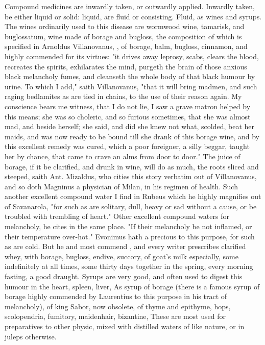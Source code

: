 {Compound medicines are inwardly taken, or outwardly applied. Inwardly taken, be either liquid or solid: liquid, are fluid or consisting. Fluid, as wines and syrups. The wines ordinarily used to this disease are wormwood wine, tamarisk, and buglossatum, wine made of borage and bugloss, the composition of which is specified in Arnoldus Villanovanus, , of borage, balm, bugloss, cinnamon, \etc{} and highly commended for its virtues: "it drives away leprosy, scabs, clears the blood, recreates the spirits, exhilarates the mind, purgeth the brain of those anxious black melancholy fumes, and cleanseth the whole body of that black humour by urine. To which I add," saith Villanovanus, "that it will bring madmen, and such raging bedlamites as are tied in chains, to the use of their reason again. My conscience bears me witness, that I do not lie, I saw a grave matron helped by this means; she was so choleric, and so furious sometimes, that she was almost mad, and beside herself; she said, and did she knew not what, scolded, beat her maids, and was now ready to be bound till she drank of this borage wine, and by this excellent remedy was cured, which a poor foreigner, a silly beggar, taught her by chance, that came to crave an alms from door to door." The juice of borage, if it be clarified, and drunk in wine, will do as much, the roots sliced and steeped, \etc{} saith Ant. Mizaldus,  who cities this story verbatim out of Villanovanus, and so doth Magninus a physician of Milan, in his regimen of health. Such another excellent compound water I find in Rubeus  which he highly magnifies out of Savanarola, "for such as are solitary, dull, heavy or sad without a cause, or be troubled with trembling of heart." Other excellent compound waters for melancholy, he cites in the same place. "If their melancholy be not inflamed, or their temperature over-hot." Evonimus hath a precious  to this purpose, for such as are cold. But he and most commend , and every writer prescribes clarified whey, with borage, bugloss, endive, succory, \etc{} of goat's milk especially, some indefinitely at all times, some thirty days together in the spring, every morning fasting, a good draught. Syrups are very good, and often used to digest this humour in the heart, spleen, liver, \etc{} As syrup of borage (there is a famous syrup of borage highly commended by Laurentius to this purpose in his tract of melancholy),  of king Sabor, now obsolete, of thyme and epithyme, hops, scolopendria, fumitory, maidenhair, bizantine, \etc{} These are most used for preparatives to other physic, mixed with distilled waters of like nature, or in juleps otherwise.

}
